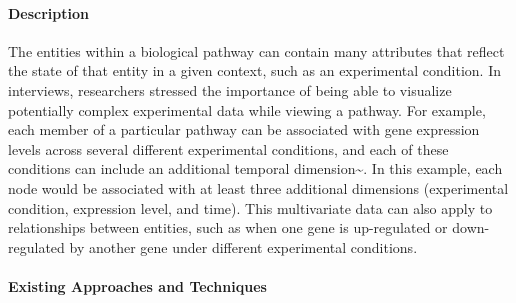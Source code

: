 \paragraph*{Description}

The entities within a biological pathway can contain many attributes
that reflect the state of that entity in a given context, such as an
experimental condition. In interviews, researchers stressed the
importance of being able to visualize potentially complex experimental
data while viewing a pathway. For example, each member of a particular
pathway can be associated with gene expression levels across several
different experimental conditions, and each of these conditions can
include an additional temporal
dimension\textasciitilde{}\cite{Barsky2008cerebral}. In this example,
each node would be associated with at least three additional dimensions
(experimental condition, expression level, and time). This multivariate
data can also apply to relationships between entities, such as when one
gene is up-regulated or down-regulated by another gene under different
experimental conditions.

\paragraph*{Existing Approaches and Techniques}
